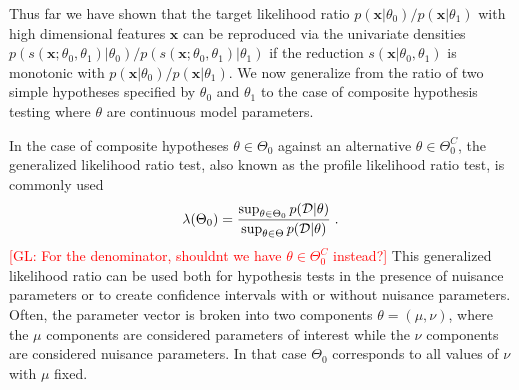 \documentclass[12pt]{article}
\numberwithin{equation}{section}
\theoremstyle{plain}
\newcommand{\glnote}[1]{\textcolor{red}{[GL: #1]}}
\begin{document}
Thus far we have shown that the target likelihood ratio
$p(\mathbf{x}|\theta_0)/p(\mathbf{x}|\theta_1)$ with high dimensional features
$\mathbf{x}$ can be reproduced via the univariate densities
$p(s(\mathbf{x};\theta_0,\theta_1)|\theta_0)/p(s(\mathbf{x};\theta_0,\theta_1)|\theta_1)$
if the reduction $s(\mathbf{x}|\theta_0, \theta_1)$ is monotonic with
$p(\mathbf{x}|\theta_0)/p(\mathbf{x}|\theta_1)$. We now generalize from the
ratio of two simple hypotheses specified by $\theta_0$ and $\theta_1$ to the
case of composite hypothesis testing where $\theta$ are continuous model
parameters.
%
%
%
%


In the case of composite hypotheses $\theta \in \Theta_0$ against an alternative
$\theta \in \Theta_0^C$, the generalized likelihood ratio test, also known as
the profile likelihood ratio test, is commonly used
\begin{equation}\label{eqn:generalized-lr}
\lambda(\Theta_0) =  \frac{ \sup_{\theta \in \Theta_0} p({\cal D} | \theta)}{ \sup_{\theta \in \Theta} p({\cal D} | \theta)} \; .
\end{equation}
\glnote{For the denominator, shouldnt we have $\theta \in \Theta_0^C$ instead?}
This generalized likelihood ratio can be used both for hypothesis tests in the
presence of nuisance parameters or to create confidence intervals with or
without nuisance parameters.  Often, the parameter vector is broken into two
components $\theta=(\mu,\nu)$, where the $\mu$ components are considered
parameters of interest while the $\nu$ components are considered nuisance
parameters. In that case $\Theta_0$ corresponds to all values of $\nu$ with
$\mu$ fixed.
\end{document}
